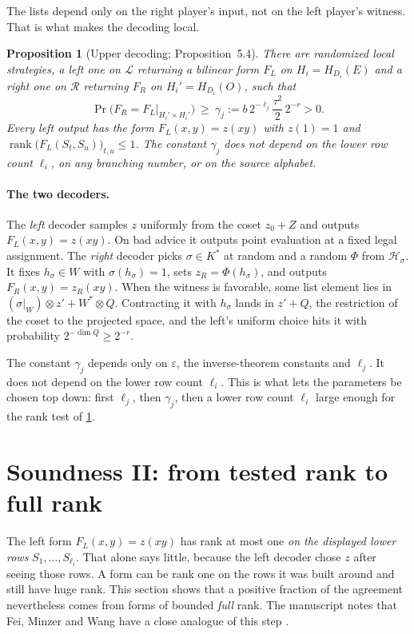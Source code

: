 \documentclass[11pt]{article}
\newtheorem{proposition}[theorem]{Proposition}
\theoremstyle{definition}
\theoremstyle{remark}
\newcommand{\eps}{\varepsilon}
\DeclareMathOperator{\rank}{rank}
\begin{document}
The lists depend only on the right player's input, not on the left player's
witness. That is what makes the decoding local.

\begin{proposition}[Upper decoding; Proposition~5.4]\label{prop:upper}
There are randomized local strategies, a left one on $\mathcal L$ returning a
bilinear form $F_L$ on $H_i=H_{D_i}(E)$ and a right one on $\mathcal R$
returning $F_R$ on $H_i'=H_{D_i}(O)$, such that
\[
 \Pr\bigl(F_R=F_L|_{H_i'\times H_i'}\bigr)\ \ge\ \gamma_j
 :=b\,2^{-\ell_j}\frac{\tau^2}2\,2^{-r}>0 .
\]
Every left output has the form $F_L(x,y)=z(xy)$ with $z(1)=1$ and
$\rank\bigl(F_L(S_t,S_u)\bigr)_{t,u}\le1$. The constant $\gamma_j$ does not
depend on the lower row count $\ell_i$, on any branching number, or on the
source alphabet.
\end{proposition}

\paragraph{The two decoders.} The \emph{left} decoder samples $z$ uniformly
from the coset $z_0+Z$ and outputs $F_L(x,y)=z(xy)$. On bad advice it outputs
point evaluation at a fixed legal assignment. The \emph{right} decoder picks
$\sigma\in K^*$ at random and a random $\Phi$ from $\mathcal H_\sigma$. It
fixes $h_\sigma\in W$ with $\sigma(h_\sigma)=1$, sets $z_R=\Phi(h_\sigma)$,
and outputs $F_R(x,y)=z_R(xy)$. When the witness is favorable, some list
element lies in $(\sigma|_W)\otimes z'+W^*\otimes Q$. Contracting it with
$h_\sigma$ lands in $z'+Q$, the restriction of the coset to the projected
space, and the left's uniform choice hits it with probability
$2^{-\dim Q}\ge2^{-r}$.

\begin{idea}
The constant $\gamma_j$ depends only on $\eps$, the inverse-theorem constants
and $\ell_j$. It does not depend on the lower row count $\ell_i$. This is what
lets the parameters be chosen top down: first $\ell_j$, then $\gamma_j$, then
a lower row count $\ell_i$ large enough for the rank test of
\cref{sec:lower}.
\end{idea}

\section{Soundness II: from tested rank to full rank}\label{sec:lower}

The left form $F_L(x,y)=z(xy)$ has rank at most one \emph{on the displayed
lower rows} $S_1,\ldots,S_{\ell_i}$. That alone says little, because the
left decoder chose $z$ after seeing those rows. A form can be rank one on the
rows it was built around and still have huge rank. This section shows that a
positive fraction of the agreement nevertheless comes from forms of bounded
\emph{full} rank. The manuscript notes that Fei, Minzer and Wang have a close
analogue of this step \cite{FMW}.
\end{document}

